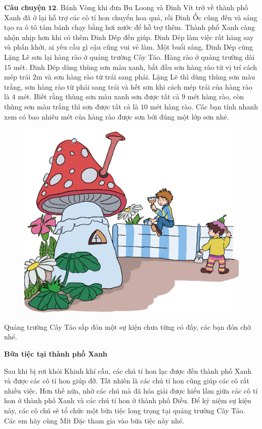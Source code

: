 	\textbf{\color{toancuabi}Câu chuyện} $\pmb{12.}$ Bánh Vòng khi đưa Bu Loong và Đinh Vít trở về thành phố Xanh đã ở lại hỗ trợ các cô tí hon chuyển hoa quả, rồi Đinh Ốc cũng đến và sáng tạo ra ô tô tám bánh chạy bằng hơi nước để hỗ trợ thêm. Thành phố Xanh càng nhộn nhịp hơn khi có thêm Đinh Dép đến giúp. Đinh Dép làm việc rất hăng say và phấn khởi, ai yêu cầu gì cậu cũng vui vẻ làm. Một buổi sáng, Đinh Dép cùng Lặng Lẽ sơn lại hàng rào ở quảng trường Cây Táo. Hàng rào ở quảng trường dài $15$ mét. Đinh Dép dùng thùng sơn màu xanh, bắt đầu sơn hàng rào từ vị trí cách mép trái $2$m và sơn hàng rào từ trái sang phải. Lặng Lẽ thì dùng thùng sơn màu trắng, sơn hàng rào từ phải sang trái và hết sơn khi cách mép trái của hàng rào là $4$ mét. Biết rằng thùng sơn màu xanh sơn được tất cả $9$ mét hàng rào, còn thùng sơn màu trắng thì sơn được tất cả là $10$ mét hàng rào. Các bạn tính nhanh xem có bao nhiêu mét của hàng rào được sơn bởi đúng một lớp sơn nhé.
	\begin{figure}[H]
		\centering
		\vspace*{-5pt}
		\captionsetup{labelformat= empty, justification=centering}
		\includegraphics[width=0.55\linewidth]{Hinh14_SonRao}
		\vspace*{-10pt}
	\end{figure}
	Quảng trường Cây Táo sắp đón một sự kiện chưa từng có đấy, các bạn đón chờ nhé.
	\vskip 0.1cm
	\centerline{\textbf{\color{toancuabi}Bữa tiệc tại thành phố Xanh}}
	\vskip 0.1cm
	Sau khi bị rơi khỏi Khinh khí cầu, các chú tí hon lạc được đến thành phố Xanh và được các cô tí hon giúp đỡ. Tất nhiên là các chú tí hon cũng giúp các cô rất nhiều việc. Hơn thế nữa, nhờ các chú mà đã hóa giải được hiểu lầm giữa các cô tí hon ở thành phố Xanh và các chú tí hon ở thành phố Diều.  Để kỷ niệm sự kiện này, các cô chú sẽ tổ chức một bữa tiệc long trọng tại quảng trường Cây Táo.
	Các em hãy cùng Mít Đặc tham gia vào bữa tiệc này nhé.
